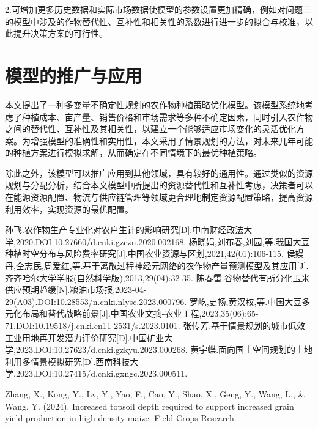 \documentclass{cumcmthesis}
\begin{document}
2.可增加更多历史数据和实际市场数据使模型的参数设置更加精确，例如对问题三的模型中涉及的作物替代性、互补性和相关性的系数进行进一步的拟合与校准，以此提升决策方案的可行性。

\section{模型的推广与应用}
本文提出了一种多变量不确定性规划的农作物种植策略优化模型。该模型系统地考虑了种植成本、亩产量、销售价格和市场需求等多种不确定因素，同时引入农作物之间的替代性、互补性及其相关性，以建立一个能够适应市场变化的灵活优化方案。为增强模型的准确性和实用性，本文采用了情景规划的方法，对未来几年可能的种植方案进行模拟求解，从而确定在不同情境下的最优种植策略。

除此之外，该模型可以推广应用到其他领域，具有较好的通用性。通过类似的资源规划与分配分析，结合本文模型中所提出的资源替代性和互补性考虑，决策者可以在能源资源配置、物流与供应链管理等领域更合理地制定资源配置策略，提高资源利用效率，实现资源的最优配置。

\begin{thebibliography}{99}  
 孙飞.农作物生产专业化对农户生计的影响研究[D].中南财经政法大学,2020.DOI:10.27660/d.cnki.gzczu.2020.002168.
 杨晓娟,刘布春,刘园,等.我国大豆种植时空分布与风险费率研究[J].中国农业资源与区划,2021,42(01):106-115.
 侯嫚丹,仝志民,周爱红,等.基于离散过程神经元网络的农作物产量预测模型及其应用[J].齐齐哈尔大学学报(自然科学版),2013,29(04):32-35.
 陈春雷.谷物替代有所分化玉米供应预期趋缓[N].粮油市场报,2023-04-29(A03).DOI:10.28553/n.cnki.nlysc.2023.000796.
 罗屹,史畅,黄汉权,等.中国大豆多元化布局和替代战略前景[J].中国农业文摘-农业工程,2023,35(06):65-71.DOI:10.19518/j.cnki.cn11-2531/s.2023.0101.
 张传芳.基于情景规划的城市低效工业用地再开发潜力评价研究[D].中国矿业大学,2023.DOI:10.27623/d.cnki.gzkyu.2023.000268.
 黄宇蝶.面向国土空间规划的土地利用多情景模拟研究[D].西南科技大学,2023.DOI:10.27415/d.cnki.gxngc.2023.000511.


 Zhang, X., Kong, Y., Lv, Y., Yao, F., Cao, Y., Shao, X., Geng, Y., Wang, L., & Wang, Y. (2024). Increased topsoil depth required to support increased grain yield production in high density maize. Field Crops Research.



\end{thebibliography}
    
\end{document}
